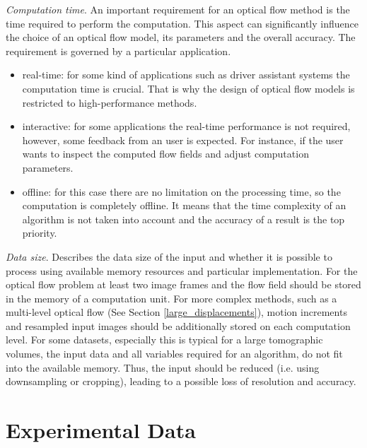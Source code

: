 \noindent \textit{Computation time}. An important requirement for an optical flow method is the time required to perform the computation. This aspect can significantly influence the choice of an optical flow model, its parameters and the overall accuracy. The requirement is governed by a particular application.       
\begin{itemize}
	\item real-time: for some kind of applications such as driver assistant systems the computation time is crucial. That is why the design of optical flow models is restricted to high-performance methods. 
	
	\item interactive: for some applications the real-time performance is not required, however, some feedback from an user is expected. For instance, if the user wants to inspect the computed flow fields and adjust computation parameters. 
	
	\item offline: for this case there are no limitation on the processing time, so the computation is completely offline. It means that the time complexity of an algorithm is not taken into account and the accuracy of a result is the top priority.
\end{itemize}


\noindent \textit{Data size}. Describes the data size of the input and whether it is possible to process using available memory resources and particular implementation. For the optical flow problem at least two image frames and the flow field should be stored in the memory of a computation unit. For more complex methods, such as a multi-level optical flow (See Section \ref{large_displacements}), motion increments and resampled input images should be additionally stored on each computation level. For some datasets, especially this is typical for a large tomographic volumes, the input data and all variables required for an algorithm, do not fit into the available memory. Thus, the input should be reduced (i.e. using downsampling or cropping), leading to a possible loss of resolution and accuracy. 


\section{Experimental Data}

